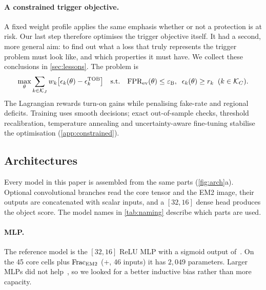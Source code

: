 \paragraph{A constrained trigger objective.}
A fixed weight profile applies the same emphasis whether or not a protection is at risk. Our last step therefore optimises the trigger objective itself. It had a second, more general aim: to find out what a loss that truly represents the trigger problem must look like, and which properties it must have. We collect these conclusions in \cref{sec:lessons}. The problem is
\begin{equation}
  \max_\theta\sum_{k\in\mathcal{K}_J}w_k\big[\epsilon_k(\theta)-\epsilon^{\mathrm{TOB}}_k\big]\quad\text{s.t.}\quad\mathrm{FPR}_{\mathrm{ev}}(\theta)\leq\varepsilon_{\mathrm{B}},\;\;\epsilon_k(\theta)\geq r_k\;\;(k\in\mathcal{K}_C).
  \label{eq:constrained}
\end{equation}
The Lagrangian rewards turn-on gains while penalising fake-rate and regional
deficits. Training uses smooth decisions; exact out-of-sample checks,
threshold recalibration, temperature annealing and uncertainty-aware
fine-tuning stabilise the optimisation (\cref{app:constrained}).

\subsection{Architectures}
\label{sec:arch}
Every model in this paper is assembled from the same parts (\cref{fig:arch}a). Optional convolutional branches read the core tensor and the EM2 image, their outputs are concatenated with scalar inputs, and a $[32,16]$ dense head produces the object score. The model names in \cref{tab:naming} describe which parts are used.

\paragraph{MLP.}
The reference model is the $[32,16]$ ReLU MLP with a sigmoid output of~\cite{kernan2026}. On the 45 core cells plus $\mathrm{Frac}_{\mathrm{EM2}}$ (\CT+\Ffeat, 46 inputs) it has $2{,}049$ parameters. Larger MLPs did not help~\cite{kernan2026}, so we looked for a better inductive bias rather than more capacity.

